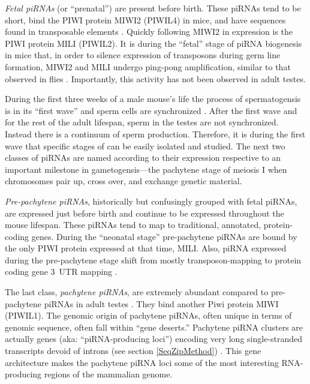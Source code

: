     \textit{Fetal piRNAs} (or ``prenatal'') are present before birth. These piRNAs tend to be short, bind the PIWI protein MIWI2 (PIWIL4) in mice, and have sequences found in transposable elements \citep{Carmell2007}. Quickly following MIWI2 in expression is the PIWI protein MILI (PIWIL2). It is during the ``fetal'' stage of piRNA biogenesis in mice that, in order to silence expression of transposons during germ line formation, MIWI2 and MILI undergo ping-pong amplification, similar to that observed in flies \citep{Kuramochi-Miyagawa2004, Aravin2006, Aravin2008a,Aravin2008}. Importantly, this activity has not been observed in adult testes.

    During the first three weeks of a male mouse's life the process of spermatogensis is in its ``first wave'' and sperm cells are synchronized \citep{Oakberg1956b, Laiho2013a}. After the first wave and for the rest of the adult lifespan, sperm in the testes are not synchronized. Instead there is a continuum of sperm production. Therefore, it is during the first wave that specific stages of can be easily isolated and studied. The next two classes of piRNAs are named according to their expression respective to an important milestone in gametogensis---the pachytene stage of meiosis I when chromosomes pair up, cross over, and exchange genetic material. 

    \textit{Pre-pachytene piRNAs}, historically but confusingly grouped with fetal piRNAs, are expressed just before birth and continue to be expressed throughout the mouse lifespan. These piRNAs tend to map to traditional, annotated, protein-coding genes. During the ``neonatal stage'' pre-pachytene piRNAs are bound by the only PIWI protein expressed at that time, MILI. Also, piRNA expressed during the pre-pachytene stage shift from mostly transposon-mapping to protein coding gene 3\textprime~UTR mapping \citep{Robine2009}.

    The last class, \textit{pachytene piRNAs}, are extremely abundant compared to pre-pachytene piRNAs in adult testes \citep{Girard2006, Lau2006, Li2013h}. They bind another Piwi protein MIWI (PIWIL1). The genomic origin of pachytene piRNAs, often unique in terms of genomic sequence, often fall within ``gene deserts.'' Pachytene piRNA clusters are actually genes (aka: ``piRNA-producing loci'') encoding very long single-stranded transcripts devoid of introns (see section \ref{SeqZipMethod}) \citep{Li2013h}. This gene architecture makes the pachytene piRNA loci some of the most interesting RNA-producing regions of the mammalian genome. 

